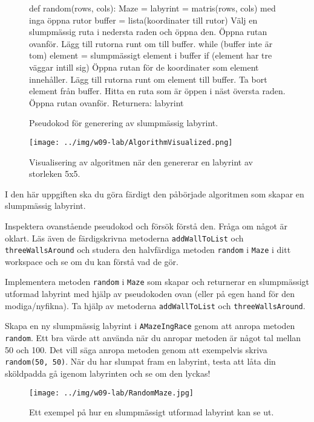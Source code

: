 \begin{figure}[H]
\begin{Code}
def random(rows, cols): Maze = {
	labyrint = matris(rows, cols) med inga öppna rutor
	buffer = lista(koordinater till rutor)
	Välj en slumpmässig ruta i nedersta raden och öppna den.
	Öppna rutan ovanför.
	Lägg till rutorna runt om till buffer.
	while (buffer inte är tom)
		element = slumpmässigt element i buffer
		if (element har tre väggar intill sig)
			Öppna rutan för de koordinater som element innehåller.
			Lägg till rutorna runt om element till buffer.
		Ta bort element från buffer.
	Hitta en ruta som är öppen i näst översta raden.
	Öppna rutan ovanför.
	Returnera: labyrint 
}
\end{Code}
	\caption{Pseudokod för generering av slumpmässig labyrint.}
	\label{lab:maze:prims-algo}
\end{figure}


\begin{figure}[H]
	\begin{center}
		\texttt{[image: ../img/w09-lab/AlgorithmVisualized.png]}
	\end{center}
	\caption{Visualisering av algoritmen när den genererar en labyrint av storleken 5x5.}
	\label{lab:maze:prims-algo-viz}
\end{figure}


\Task I den här uppgiften ska du göra färdigt den påbörjade algoritmen som skapar en slumpmässig labyrint.

\Subtask Inspektera ovanstående pseudokod och försök förstå den. Fråga om något är oklart. Läs även de färdigskrivna metoderna \texttt{addWallToList} och \texttt{threeWallsAround} och studera den halvfärdiga metoden \texttt{random} i \texttt{Maze} i ditt workspace och se om du kan förstå vad de gör.

\Subtask Implementera metoden \texttt{random} i \texttt{Maze} som skapar och returnerar en slumpmässigt utformad labyrint med hjälp av pseudokoden ovan (eller på egen hand för den modiga/nyfikna). Ta hjälp av metoderna \texttt{addWallToList} och \texttt{threeWallsAround}.

\Subtask Skapa en ny slumpmässig labyrint i \texttt{AMazeIngRace} genom att anropa metoden \texttt{random}. Ett bra värde att använda när du anropar metoden är något tal mellan 50 och 100. Det vill säga anropa metoden genom att exempelvis skriva \texttt{random(50, 50)}. När du har slumpat fram en labyrint, testa att låta din sköldpadda gå igenom labyrinten och se om den lyckas!

\begin{figure}[h]
	\begin{center}
		\texttt{[image: ../img/w09-lab/RandomMaze.jpg]}
	\end{center}
	\caption{Ett exempel på hur en slumpmässigt utformad labyrint kan se ut.}
\end{figure}

